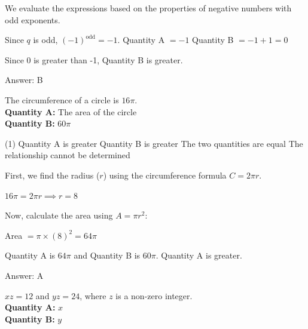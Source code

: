 \documentclass[11pt,paper=a4,answers]{exam}
\begin{document}
\begin{questions}
\begin{solution}
We evaluate the expressions based on the properties of negative numbers with odd exponents.
\vspace{5pt}
\begin{center}
Since $q$ is odd, $(-1)^{\text{odd}} = -1$.
\vspace{5pt}
Quantity A $= -1$
\vspace{5pt}
Quantity B $= -1 + 1 = 0$
\end{center}
\vspace{5pt}
Since 0 is greater than -1, Quantity B is greater.

Answer: \colorbox{yellow!100}{B}
\end{solution}

\vspace{1cm}

\question
The circumference of a circle is $16\pi$.
\vspace{5pt}\\
\textbf{Quantity A: } The area of the circle \\
\vspace{5pt}
\textbf{Quantity B: } $60\pi$

\begin{tasks}(1)
\task[A)] Quantity A is greater
\task[B)] Quantity B is greater
\task[C)] The two quantities are equal
\task[D)] The relationship cannot be determined
\end{tasks}

\begin{solution}
First, we find the radius ($r$) using the circumference formula $C = 2\pi r$.
\vspace{5pt}
\begin{center}
$16\pi = 2\pi r \implies r = 8$
\end{center}
\vspace{5pt}
Now, calculate the area using $A = \pi r^2$:
\vspace{5pt}
\begin{center}
Area $= \pi \times (8)^2 = 64\pi$
\end{center}
\vspace{5pt}
Quantity A is $64\pi$ and Quantity B is $60\pi$. Quantity A is greater.

Answer: \colorbox{yellow!100}{A}
\end{solution}

\vspace{1cm}

\question
$xz = 12$ and $yz = 24$, where $z$ is a non-zero integer.
\vspace{5pt}\\
\textbf{Quantity A: } $x$ \\
\vspace{5pt}
\textbf{Quantity B: } $y$


\end{questions}
\end{document}
